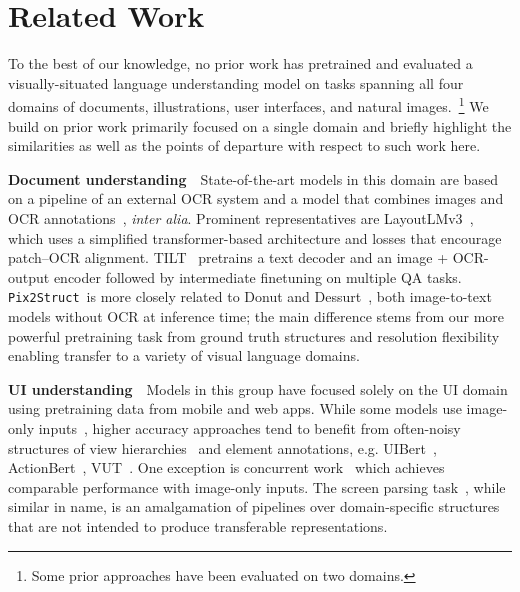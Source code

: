 \documentclass{article} \usepackage[accepted]{icml2023}
\newcommand\ourmodel{{\texttt{Pix2Struct}}}
\begin{document}
\section{Related Work}
To the best of our knowledge, no prior work has pretrained and evaluated a visually-situated language understanding model on tasks spanning all four domains of documents, illustrations, user interfaces, and natural images.~\footnote{Some prior approaches have been evaluated on two domains.} We build on prior work primarily focused on a single domain and briefly highlight the similarities as well as the points of departure with respect to such work here.

\textbf{Document understanding}~~State-of-the-art models in this domain are based on a pipeline of an external OCR system and a model that combines images and OCR annotations~\citep{docformer,powalski2021going,layoutlmv2}, \textit{inter alia}. Prominent representatives are LayoutLMv3~\citep{layoutlmv3}, which uses a simplified transformer-based architecture and losses that encourage patch--OCR alignment. TILT~\citep{powalski2021going} pretrains a text decoder and an image + OCR-output encoder followed by intermediate finetuning on multiple QA tasks. \ourmodel~is more closely related to Donut and Dessurt~\citep{dessurt}, both image-to-text models without OCR at inference time; the main difference stems from our more powerful pretraining task from ground truth structures and resolution flexibility enabling transfer to a variety of visual language domains.

\textbf{UI understanding}~~Models in this group have focused solely on the UI domain using pretraining data from mobile and web apps. While some models use image-only inputs~\citep{Liu2018LearningDS, Chen2020UnblindYA}, higher accuracy approaches tend to benefit from often-noisy structures of view hierarchies~\citep{li-etal-2020-mapping} and element annotations, e.g. UIBert~\citep{uibert}, ActionBert~\citep{actionbert}, VUT~\citep{li2021vut}. One exception is concurrent work~\citep{li2023spotlight} which achieves comparable performance with image-only inputs. The screen parsing task~\citep{wu2021screen}, while similar in name, is an amalgamation of pipelines over domain-specific structures that are not intended to produce transferable representations.
\end{document}
